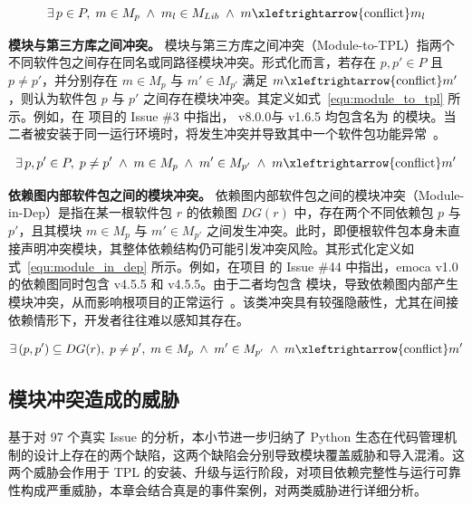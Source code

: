 \begin{equation}
    \label{equ:module_to_lib}
    \exists\, p \in P,\; m \in M_p \;\land\; m_l \in M_{Lib} \;\land\; m \xleftrightarrow{\text{conflict}} m_l 
\end{equation}

\textbf{模块与第三方库之间冲突。}
模块与第三方库之间冲突（Module-to-TPL）指两个不同软件包之间存在同名或同路径模块冲突。形式化而言，若存在 $p, p' \in P$ 且 $p \neq p'$，并分别存在 $m \in M_p$ 与 $m' \in M_{p'}$ 满足 $m \xleftrightarrow{\text{conflict}} m'$，则认为软件包 $p$ 与 $p'$ 之间存在模块冲突。其定义如式~\ref{equ:module_to_tpl} 所示。例如，在  项目的 Issue \#3 中指出， v8.0.0与  v1.6.5 均包含名为  的模块。当二者被安装于同一运行环境时，将发生冲突并导致其中一个软件包功能异常~\cite{udataplugin3}。

\begin{equation}
    \label{equ:module_to_tpl}
    \exists\, p, p' \in P,\; p \neq p' \;\land\; m \in M_p \;\land\; m' \in M_{p'} \;\land\; m \xleftrightarrow{\text{conflict}} m'
\end{equation}

\textbf{依赖图内部软件包之间的模块冲突。}
依赖图内部软件包之间的模块冲突（Module-in-Dep）是指在某一根软件包 $r$ 的依赖图 $DG(r)$ 中，存在两个不同依赖包 $p$ 与 $p'$，且其模块 $m \in M_p$ 与 $m' \in M_{p'}$ 之间发生冲突。此时，即便根软件包本身未直接声明冲突模块，其整体依赖结构仍可能引发冲突风险。其形式化定义如式~\ref{equ:module_in_dep} 所示。例如，在项目  的 Issue \#44 中指出，emoca v1.0 的依赖图同时包含  v4.5.5 和  v4.5.5。由于二者均包含  模块，导致依赖图内部产生模块冲突，从而影响根项目的正常运行~\cite{emocaissue44}。该类冲突具有较强隐蔽性，尤其在间接依赖情形下，开发者往往难以感知其存在。

\begin{equation}
    \label{equ:module_in_dep}
    \exists\, (p, p') \subseteq DG(r),\; p \neq p', \; 
    m \in M_p \;\land\; m' \in M_{p'} \;\land\; m \xleftrightarrow{\text{conflict}} m'
\end{equation}

\subsection{模块冲突造成的威胁}
基于对 97 个真实 Issue 的分析，本小节进一步归纳了 Python 生态在代码管理机制的设计上存在的两个缺陷，这两个缺陷会分别导致模块覆盖威胁和导入混淆。这两个威胁会作用于 TPL 的安装、升级与运行阶段，对项目依赖完整性与运行可靠性构成严重威胁，本章会结合真是的事件案例，对两类威胁进行详细分析。

